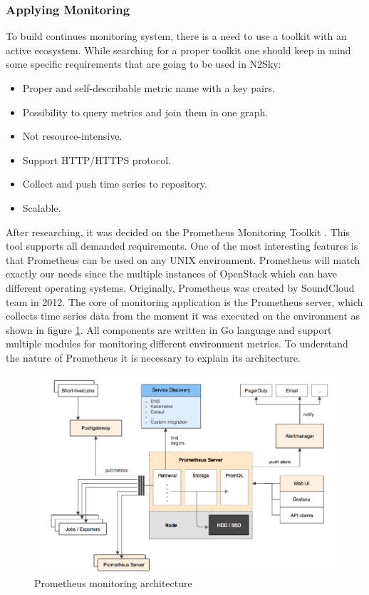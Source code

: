 \subsubsection{Applying Monitoring}\label{Applying Monitoring}
To build continues monitoring system, there is a need to use a toolkit with an active ecosystem. While searching for a proper toolkit one should keep in mind some specific requirements that are going to be used in N2Sky:
\begin{itemize}
\item Proper and self-describable metric name with a key pairs.
\item Possibility to query metrics and join them in one graph.
\item Not resource-intensive.
\item Support HTTP/HTTPS protocol.
\item Collect and push time series to repository.
\item Scalable.
\end{itemize}

After researching, it was decided on the Prometheus Monitoring Toolkit \cite{alert_overview}. This tool supports all demanded requirements. One of the most interesting features is that Prometheus can be used on any UNIX environment. Prometheus will match exactly our needs since the multiple instances of OpenStack which can have different operating systems.
Originally, Prometheus was created by SoundCloud team in 2012. The core of monitoring application is the Prometheus server, which collects time series data from the moment it was executed on the environment as shown in figure \ref{fig:prometherus_arch}. All components are written in Go language and support multiple modules for monitoring different environment metrics. 
To understand the nature of Prometheus it is necessary to explain its architecture. 

\begin{figure}[htbp]
\begin{center}
  \includegraphics[width=\linewidth]{components/3/prometherus_arch.png}
  \caption{Prometheus monitoring architecture}
  \label{fig:prometherus_arch}
\end{center}
\end{figure}

